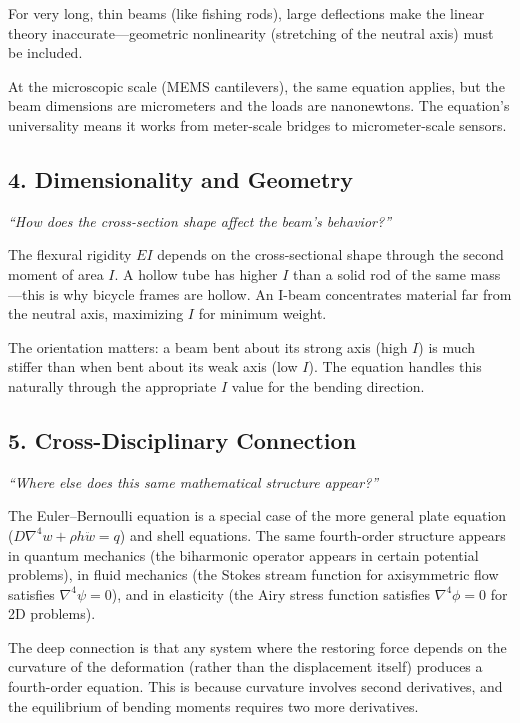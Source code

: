 For very long, thin beams (like fishing rods), large deflections make the linear theory inaccurate---geometric nonlinearity (stretching of the neutral axis) must be included.

At the microscopic scale (MEMS cantilevers), the same equation applies, but the beam dimensions are micrometers and the loads are nanonewtons. The equation's universality means it works from meter-scale bridges to micrometer-scale sensors.

\subsection*{4. Dimensionality and Geometry}
\textit{``How does the cross-section shape affect the beam's behavior?''}

The flexural rigidity $EI$ depends on the cross-sectional shape through the second moment of area $I$. A hollow tube has higher $I$ than a solid rod of the same mass---this is why bicycle frames are hollow. An I-beam concentrates material far from the neutral axis, maximizing $I$ for minimum weight.

The orientation matters: a beam bent about its strong axis (high $I$) is much stiffer than when bent about its weak axis (low $I$). The equation handles this naturally through the appropriate $I$ value for the bending direction.

\subsection*{5. Cross-Disciplinary Connection}
\textit{``Where else does this same mathematical structure appear?''}

The Euler--Bernoulli equation is a special case of the more general plate equation ($D\nabla^4 w + \rho h \ddot{w} = q$) and shell equations. The same fourth-order structure appears in quantum mechanics (the biharmonic operator appears in certain potential problems), in fluid mechanics (the Stokes stream function for axisymmetric flow satisfies $\nabla^4 \psi = 0$), and in elasticity (the Airy stress function satisfies $\nabla^4 \phi = 0$ for 2D problems).

The deep connection is that any system where the restoring force depends on the curvature of the deformation (rather than the displacement itself) produces a fourth-order equation. This is because curvature involves second derivatives, and the equilibrium of bending moments requires two more derivatives.



